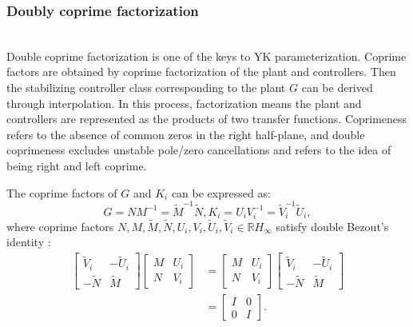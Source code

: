 \documentclass[journal]{IEEEtran}
\begin{document}
\subsubsection{Doubly coprime factorization}
\label{Section 3.2.2}
~\\

Double coprime factorization is one of the keys to YK parameterization. Coprime factors are obtained by coprime factorization of the plant and controllers. Then the stabilizing controller class corresponding to the plant $G$ can be derived through interpolation. In this process, factorization means the plant and controllers are represented as the products of two transfer functions. Coprimeness refers to the absence of common zeros in the right half-plane, and double coprimeness excludes unstable pole/zero cancellations and refers to the idea of being right and left coprime.

The coprime factors of $G$ and $K_i$ can be expressed as:
\begin{equation}
  G=N M^{-1}=\tilde{M}^{-1} \tilde{N}, K_{i}=U_{i} V_{i}^{-1}=\tilde{V}_{i}^{-1} \tilde{U}_{i},
\end{equation}
where coprime factors $N, M, \tilde{M}, \tilde{N}, U_{i}, V_{i}, \tilde{U}_{i}, \tilde{V}_{i} \in \mathbb{R} H_{\infty}$ satisfy double Bezout's identity \citep{pommaret1998generalized}:
\begin{equation}
  \begin{aligned}
    \left[\begin{array}{cc}
        \tilde{V}_{i} & -\tilde{U}_{i} \\
        -\tilde{N}    & \tilde{M}
      \end{array}\right]\left[\begin{array}{cc}
        M & U_{i} \\
        N & V_{i}
      \end{array}\right]
     & =\left[\begin{array}{cc}
        M & U_{i} \\
        N & V_{i}
      \end{array}\right]\left[\begin{array}{cc}
        \tilde{V}_{i} & -\tilde{U}_{i} \\
        -\tilde{N}    & \tilde{M}
      \end{array}\right] \\
     & =\left[\begin{array}{cc}
        I & 0 \\
        0 & I
      \end{array}\right].
  \end{aligned}
  \label{Eq16}
\end{equation}
\end{document}
